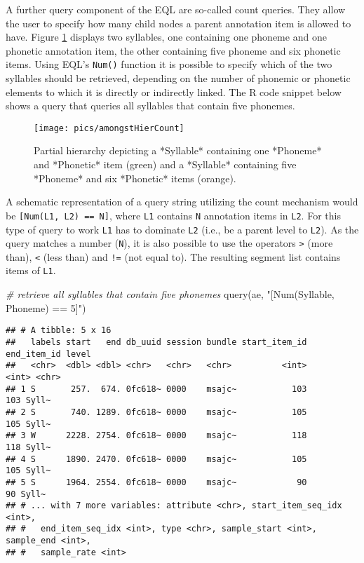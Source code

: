 \documentclass[
]{book}
\newenvironment{Shaded}{\begin{snugshade}}{\end{snugshade}}
\newcommand{\CommentTok}[1]{\textcolor[rgb]{0.56,0.35,0.01}{\textit{#1}}}
\newcommand{\FunctionTok}[1]{\textcolor[rgb]{0.00,0.00,0.00}{#1}}
\newcommand{\NormalTok}[1]{#1}
\newcommand{\StringTok}[1]{\textcolor[rgb]{0.31,0.60,0.02}{#1}}
\begin{document}
A further query component of the EQL are so-called count queries. They allow the user to specify how many child nodes a parent annotation item is allowed to have. Figure \ref{fig:query-amongstHierCount} displays two syllables, one containing one phoneme and one phonetic annotation item, the other containing five phoneme and six phonetic items. Using EQL's \texttt{Num()} function it is possible to specify which of the two syllables should be retrieved, depending on the number of phonemic or phonetic elements to which it is directly or indirectly linked. The R code snippet below shows a query that queries all syllables that contain five phonemes.

\begin{figure}

{\centering \texttt{[image: pics/amongstHierCount]} 

}

\caption{Partial hierarchy depicting a *Syllable* containing one *Phoneme* and  *Phonetic* item (green) and a *Syllable* containing five *Phoneme* and six *Phonetic* items (orange).}\label{fig:query-amongstHierCount}
\end{figure}

A schematic representation of a query string utilizing the count mechanism would be \texttt{{[}Num(L1,\ L2)\ ==\ N{]}}, where \texttt{L1} contains \texttt{N} annotation items in \texttt{L2}. For this type of query to work \texttt{L1} has to dominate \texttt{L2} (i.e., be a parent level to \texttt{L2}). As the query matches a number (\texttt{N}), it is also possible to use the operators \texttt{\textgreater{}} (more than), \texttt{\textless{}} (less than) and \texttt{!=} (not equal to). The resulting segment list contains items of \texttt{L1}.

\begin{Shaded}
\begin{Highlighting}[]
\CommentTok{\# retrieve all syllables that contain five phonemes}
\FunctionTok{query}\NormalTok{(ae, }\StringTok{"[Num(Syllable, Phoneme) == 5]"}\NormalTok{)}
\end{Highlighting}
\end{Shaded}

\begin{verbatim}
## # A tibble: 5 x 16
##   labels start   end db_uuid session bundle start_item_id end_item_id level
##   <chr>  <dbl> <dbl> <chr>   <chr>   <chr>          <int>       <int> <chr>
## 1 S       257.  674. 0fc618~ 0000    msajc~           103         103 Syll~
## 2 S       740. 1289. 0fc618~ 0000    msajc~           105         105 Syll~
## 3 W      2228. 2754. 0fc618~ 0000    msajc~           118         118 Syll~
## 4 S      1890. 2470. 0fc618~ 0000    msajc~           105         105 Syll~
## 5 S      1964. 2554. 0fc618~ 0000    msajc~            90          90 Syll~
## # ... with 7 more variables: attribute <chr>, start_item_seq_idx <int>,
## #   end_item_seq_idx <int>, type <chr>, sample_start <int>, sample_end <int>,
## #   sample_rate <int>
\end{verbatim}
\end{document}
